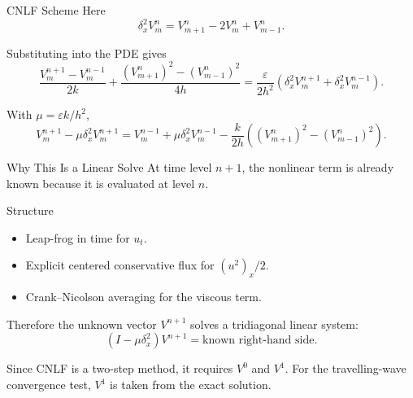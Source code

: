 \documentclass[aspectratio=169,11pt]{beamer}
\begin{document}
\begin{frame}{CNLF Scheme}
    Here
    \begin{equation}
        \delta_x^2V_m^n=V_{m+1}^n-2V_m^n+V_{m-1}^n.
    \end{equation}

    Substituting into the PDE gives
    \begin{equation}
        \frac{V_m^{n+1}-V_m^{n-1}}{2k}
        +
        \frac{(V_{m+1}^n)^2-(V_{m-1}^n)^2}{4h}
        =
        \frac{\varepsilon}{2h^2}
        \left(\delta_x^2V_m^{n+1}+\delta_x^2V_m^{n-1}\right).
    \end{equation}

    With $\mu=\varepsilon k/h^2$,
    \begin{equation}
        \boxed{
        V_m^{n+1}-\mu\delta_x^2V_m^{n+1}
        =
        V_m^{n-1}+\mu\delta_x^2V_m^{n-1}
        -
        \frac{k}{2h}
        \left((V_{m+1}^n)^2-(V_{m-1}^n)^2\right).}
    \end{equation}
\end{frame}

\begin{frame}{Why This Is a Linear Solve}
    At time level $n+1$, the nonlinear term is already known because it is evaluated at level $n$.

    \begin{block}{Structure}
        \begin{itemize}
            \item Leap-frog in time for $u_t$.
            \item Explicit centered conservative flux for $(u^2)_x/2$.
            \item Crank--Nicolson averaging for the viscous term.
        \end{itemize}
    \end{block}

    Therefore the unknown vector $V^{n+1}$ solves a tridiagonal linear system:
    \begin{equation}
        \left(I-\mu\delta_x^2\right)V^{n+1}=\text{known right-hand side}.
    \end{equation}

    Since CNLF is a two-step method, it requires $V^0$ and $V^1$.
    For the travelling-wave convergence test, $V^1$ is taken from the exact solution.
\end{frame}
\end{document}
